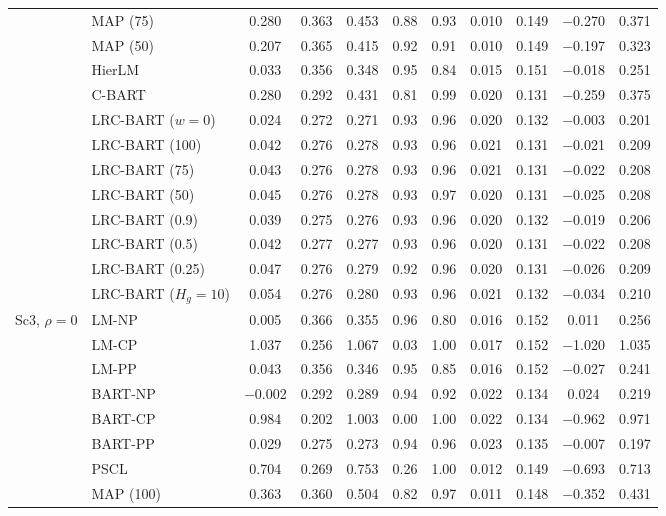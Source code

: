\documentclass[11pt]{article}
\theoremstyle{definition}
\theoremstyle{plain}
\begin{document}
\begin{center}
\begin{longtable}{llccccccccc}
& MAP (75) & 0.280 & 0.363 & 0.453 & 0.88 & 0.93 & 0.010 & 0.149 & $-$0.270 & 0.371 \\
& MAP (50) & 0.207 & 0.365 & 0.415 & 0.92 & 0.91 & 0.010 & 0.149 & $-$0.197 & 0.323 \\
& HierLM & 0.033 & 0.356 & 0.348 & 0.95 & 0.84 & 0.015 & 0.151 & $-$0.018 & 0.251 \\
& C-BART & 0.280 & 0.292 & 0.431 & 0.81 & 0.99 & 0.020 & 0.131 & $-$0.259 & 0.375 \\
& LRC-BART ($w=0$) & 0.024 & 0.272 & 0.271 & 0.93 & 0.96 & 0.020 & 0.132 & $-$0.003 & 0.201 \\
& LRC-BART (100) & 0.042 & 0.276 & 0.278 & 0.93 & 0.96 & 0.021 & 0.131 & $-$0.021 & 0.209 \\
& LRC-BART (75) & 0.043 & 0.276 & 0.278 & 0.93 & 0.96 & 0.021 & 0.131 & $-$0.022 & 0.208 \\
& LRC-BART (50) & 0.045 & 0.276 & 0.278 & 0.93 & 0.97 & 0.020 & 0.131 & $-$0.025 & 0.208 \\
& LRC-BART (0.9) & 0.039 & 0.275 & 0.276 & 0.93 & 0.96 & 0.020 & 0.132 & $-$0.019 & 0.206 \\
& LRC-BART (0.5) & 0.042 & 0.277 & 0.277 & 0.93 & 0.96 & 0.020 & 0.131 & $-$0.022 & 0.208 \\
& LRC-BART (0.25) & 0.047 & 0.276 & 0.279 & 0.92 & 0.96 & 0.020 & 0.131 & $-$0.026 & 0.209 \\
& LRC-BART ($H_g=10$) & 0.054 & 0.276 & 0.280 & 0.93 & 0.96 & 0.021 & 0.132 & $-$0.034 & 0.210 \\
\midrule
\multirow{20}{*}{Sc3, $\rho=0$} & LM-NP & 0.005 & 0.366 & 0.355 & 0.96 & 0.80 & 0.016 & 0.152 & 0.011 & 0.256 \\
& LM-CP & 1.037 & 0.256 & 1.067 & 0.03 & 1.00 & 0.017 & 0.152 & $-$1.020 & 1.035 \\
& LM-PP & 0.043 & 0.356 & 0.346 & 0.95 & 0.85 & 0.016 & 0.152 & $-$0.027 & 0.241 \\
& BART-NP & $-$0.002 & 0.292 & 0.289 & 0.94 & 0.92 & 0.022 & 0.134 & 0.024 & 0.219 \\
& BART-CP & 0.984 & 0.202 & 1.003 & 0.00 & 1.00 & 0.022 & 0.134 & $-$0.962 & 0.971 \\
& BART-PP & 0.029 & 0.275 & 0.273 & 0.94 & 0.96 & 0.023 & 0.135 & $-$0.007 & 0.197 \\
& PSCL & 0.704 & 0.269 & 0.753 & 0.26 & 1.00 & 0.012 & 0.149 & $-$0.693 & 0.713 \\
& MAP (100) & 0.363 & 0.360 & 0.504 & 0.82 & 0.97 & 0.011 & 0.148 & $-$0.352 & 0.431 \\

\end{longtable}
\end{center}
\end{document}
